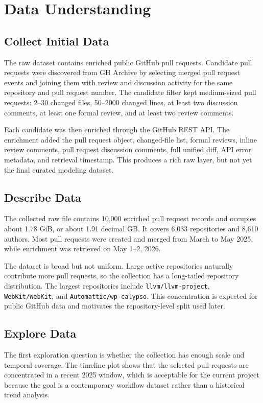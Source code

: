 \section{Data Understanding}

\subsection{Collect Initial Data}

The raw dataset contains enriched public GitHub pull requests. Candidate pull requests were discovered from GH Archive by selecting merged pull request events and joining them with review and discussion activity for the same repository and pull request number. The candidate filter kept medium-sized pull requests: 2--30 changed files, 50--2000 changed lines, at least two discussion comments, at least one formal review, and at least two review comments.

Each candidate was then enriched through the GitHub REST API. The enrichment added the pull request object, changed-file list, formal reviews, inline review comments, pull request discussion comments, full unified diff, API error metadata, and retrieval timestamp. This produces a rich raw layer, but not yet the final curated modeling dataset.

\subsection{Describe Data}

The collected raw file contains 10,000 enriched pull request records and occupies about 1.78 GiB, or about 1.91 decimal GB. It covers 6,033 repositories and 8,610 authors. Most pull requests were created and merged from March to May 2025, while enrichment was retrieved on May 1--2, 2026.

The dataset is broad but not uniform. Large active repositories naturally contribute more pull requests, so the collection has a long-tailed repository distribution. The largest repositories include \texttt{llvm/llvm-project}, \texttt{WebKit/WebKit}, and \texttt{Automattic/wp-calypso}. This concentration is expected for public GitHub data and motivates the repository-level split used later.

\subsection{Explore Data}

The first exploration question is whether the collection has enough scale and temporal coverage. The timeline plot shows that the selected pull requests are concentrated in a recent 2025 window, which is acceptable for the current project because the goal is a contemporary workflow dataset rather than a historical trend analysis.

